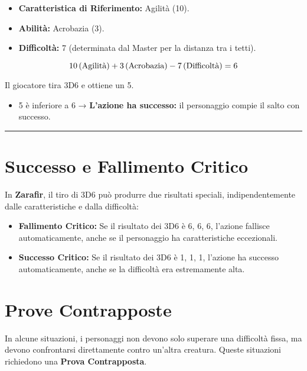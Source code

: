 \documentclass[../manuale_main.tex]{subfiles}
\begin{document}
\begin{itemize}
    \item \textbf{Caratteristica di Riferimento:} Agilità (10).
    \item \textbf{Abilità:} Acrobazia (3).
    \item \textbf{Difficoltà:} 7 (determinata dal Master per la distanza tra i tetti).
\end{itemize}

\[
10 \, (\textnormal{Agilità}) + 3 \, (\textnormal{Acrobazia}) - 7 \, (\textnormal{Difficoltà}) = 6
\]

Il giocatore tira 3D6 e ottiene un 5.

\begin{itemize}
    \item 5 è inferiore a 6 → \textbf{L'azione ha successo:} il personaggio compie il salto con successo.
\end{itemize}

\vspace{0.5cm}
\noindent
\begin{center}
\rule{\textwidth}{0.4pt} 
\end{center}
\vspace{0.5cm}

\section{Successo e Fallimento Critico}
In \textbf{Zarafir}, il tiro di 3D6 può produrre due risultati speciali, indipendentemente dalle caratteristiche e dalla difficoltà:

\begin{itemize}
    \item \textbf{Fallimento Critico:} Se il risultato dei 3D6 è 6, 6, 6, l'azione fallisce automaticamente, anche se il personaggio ha caratteristiche eccezionali.
    \item \textbf{Successo Critico:} Se il risultato dei 3D6 è 1, 1, 1, l'azione ha successo automaticamente, anche se la difficoltà era estremamente alta.
\end{itemize}

\vspace{0.3cm}

\section{Prove Contrapposte}
In alcune situazioni, i personaggi non devono solo superare una difficoltà fissa, ma devono confrontarsi direttamente contro un’altra creatura. Queste situazioni richiedono una \textbf{Prova Contrapposta}.
\end{document}
